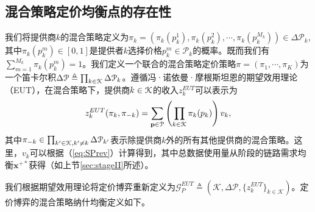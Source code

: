 \subsection{混合策略定价均衡点的存在性}\label{sec:exist1}
我们将提供商$k$的混合策略定义为$\pi_{k}=(\pi_k(p_{k}^1),\pi_k(p_{k}^2),\cdots,\pi_k(p_{k}^{M_{k}}))\in\Delta \mathcal{P}_{k}$, 其中$\pi_k(p_{k}^m)\in[0,1]$是提供者$k$选择价格$p_{k}^m\in\mathcal{P}_k$的概率。既而我们有$\sum_{m=1}^{M_k}\pi_k\left(p_{k}^{m}\right)=1$。我们定义一个联合的混合策略定价策略$\pi=(\pi_{1},\cdots,\pi_{K})$为一个笛卡尔积$\Delta \mathcal{P}\triangleq\prod_{k\in\mathcal{K}} \Delta \mathcal{P}_{k}$。遵循冯·诺依曼·摩根斯坦恩的期望效用理论（EUT）\cite{Von}，在混合策略下，提供商$k\in\mathcal{K}$的收入$z_k^{EUT}$可以表示为
\begin{equation}\label{eq:EUT}
z_{k}^{EUT}(\pi_{k},\pi_{-k})=\sum_{\mathbf{p}\in \mathcal{P}}\left(\prod_{k\in\mathcal{K}}\pi_k(p_{k})\right)v_k,
\end{equation}
其中$\pi_{-k}\in\prod_{k'\in\mathcal{K},k'\neq k}\Delta\mathcal{P}_{k'}$表示除提供商$k$外的所有其他提供商的混合策略。这里，$v_k$可以根据（\ref{eq:SPrev}）计算得到，其中总数据使用量从阶段\uppercase\expandafter{}的链路需求均衡$\mathbf{x}^{+*}$获得（如上节\ref{sec:stageII}所述）。

我们根据期望效用理论将定价博弈重新定义为$\mathcal{G}_P^{EUT}\triangleq(\mathcal{K},\Delta\mathcal{P},\{z^{EUT}_k\}_{k\in\mathcal{K}})$。定价博弈的混合策略纳什均衡定义如下。

